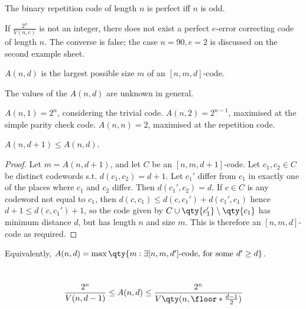 \begin{example}
    The binary repetition code of length $n$ is perfect iff $n$ is odd.
\end{example}

\begin{remark}
    If $\frac{2^n}{V(n,e)}$ is not an integer, there does not exist a perfect $e$-error correcting code of length $n$.
    The converse is false; the case $n = 90, e = 2$ is discussed on the second example sheet.
\end{remark}

\begin{definition}[$A(n,d)$]
    $A(n,d)$ is the largest possible size $m$ of an $[n,m,d]$-code.
\end{definition}

The values of the $A(n,d)$ are unknown in general.

\begin{example}
    $A(n,1) = 2^n$, considering the trivial code.
    $A(n,2) = 2^{n-1}$, maximised at the simple parity check code.
    $A(n,n) = 2$, maximised at the repetition code.
\end{example}

\begin{lemma}
    $A(n,d+1) \leq A(n,d)$.
\end{lemma}

\begin{proof}
    Let $m = A(n,d+1)$, and let $C$ be an $[n,m,d+1]$-code.
    Let $c_1, c_2 \in C$ be distinct codewords s.t. $d(c_1,c_2) = d+1$.
    Let $c_1'$ differ from $c_1$ in exactly one of the places where $c_1$ and $c_2$ differ.
    Then $d(c_1', c_2) = d$.
    If $c \in C$ is any codeword not equal to $c_1$, then $d(c,c_1) \leq d(c,c_1') + d(c_1',c_1)$ hence $d + 1 \leq d(c,c_1') + 1$, so the code given by $C \cup \qty{c_1'} \setminus \qty{c_1}$ has minimum distance $d$, but has length $n$ and size $m$.
    This is therefore an $[n,m,d]$-code as required.
\end{proof}

\begin{corollary}
    Equivalently, $A(n,d) = \max \qty{m : \exists [n,m,d'] \text{-code, for some } d' \geq d}$.
\end{corollary}

\begin{theorem} ~\vspace*{-1.5\baselineskip}
    \begin{align*}
        \frac{2^n}{V(n,d-1)} \leq A(n,d) \leq \frac{2^n}{V\qty(n,\floor*{\frac{d-1}{2}})}
    \end{align*}
\end{theorem}

